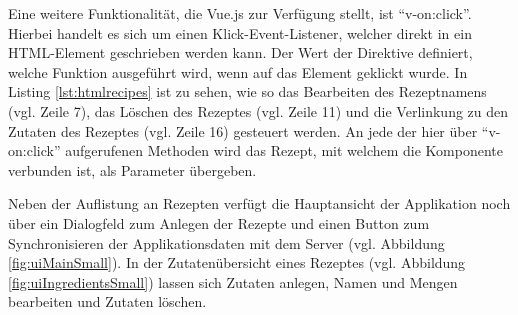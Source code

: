 \documentclass[a4paper, 12pt]{scrreprt}
\begin{document}
Eine weitere Funktionalität, die Vue.js zur Verfügung stellt, ist \enquote{v-on:click}. Hierbei handelt es sich um einen Klick-Event-Listener, welcher direkt in ein HTML-Element geschrieben werden kann. Der Wert der Direktive definiert, welche Funktion ausgeführt wird, wenn auf das Element geklickt wurde. In Listing \ref{lst:htmlrecipes} ist zu sehen, wie so das Bearbeiten des Rezeptnamens (vgl. Zeile 7), das Löschen des Rezeptes (vgl. Zeile 11) und die Verlinkung zu den Zutaten des Rezeptes (vgl. Zeile 16) gesteuert werden. An jede der hier über \enquote{v-on:click} aufgerufenen Methoden wird das Rezept, mit welchem die Komponente verbunden ist, als Parameter übergeben. 

\begin{minipage}{\linewidth}
	
\end{minipage}

Neben der Auflistung an Rezepten verfügt die Hauptansicht der Applikation noch über ein Dialogfeld zum Anlegen der Rezepte und einen Button zum Synchronisieren der Applikationsdaten mit dem Server (vgl. Abbildung \ref{fig:uiMainSmall}). In der Zutatenübersicht eines Rezeptes (vgl. Abbildung \ref{fig:uiIngredientsSmall}) lassen sich Zutaten anlegen, Namen und Mengen bearbeiten und Zutaten löschen.
\end{document}
